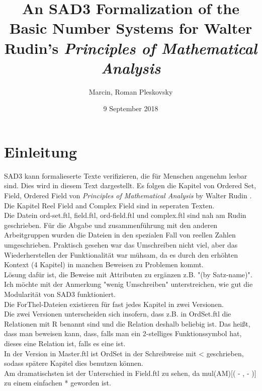 \documentclass{article}
\begin{document}
\title{An SAD3 Formalization of the Basic Number Systems for Walter Rudin's
\it{Principles of Mathematical Analysis}}

\author{Marcin, Roman Pleskovsky}

\date{9 September 2018}

\maketitle


\section{Einleitung}
SAD3 kann formalieserte Texte verifizieren, die f\"ur Menschen angenehm lesbar sind.
Dies wird in diesem Text dargestellt. Es folgen die Kapitel von Ordered Set, Field, Ordered Field von {\it Principles of Mathematical Analysis} by Walter Rudin \cite{Rudin}.\\
Die Kapitel Reel Field and Complex Field sind in seperaten Texten.\\

Die Datein ord-set.ftl, field.ftl, ord-field.ftl und complex.ftl sind nah am Rudin geschrieben. F\"ur die Abgabe und zusammenf\"uhrung mit den anderen Arbeitgruppen wurden die Dateien in den spezialen Fall von reellen Zahlen umgeschrieben. Praktisch gesehen war das Umschreiben nicht viel, aber das Wiederherstellen der Funktionalit\"at war m\"uhsam, da es durch den erh\"ohten Kontext (4 Kapitel) in manchen Beweisen zu Problemen kommt.\\
L\"osung daf\"ur ist, die Beweise mit Attributen zu erg\"anzen z.B. "(by Satz-name)".
Ich m\"ochte mit der Anmerkung "wenig Umschreiben" unterstreichen, wie gut die Modularit\"at von SAD3 funktioniert.\\

Die ForThel-Dateien existieren f\"ur fast jedes Kapitel in zwei Versionen.\\
Die zwei Versionen unterscheiden sich insofern, dass z.B. in OrdSet.ftl die Relationen mit R benannt sind und die Relation deshalb beliebig ist. Das hei\ss t, dass man beweisen kann, dass, falls man ein 2-stelliges Funktionssymbol hat, dieses eine Relation ist, falls es eine ist.\\
In der Version in Master.ftl ist OrdSet in der Schreibweise mit < geschrieben, sodass sp\"atere Kapitel dies benutzen k\"onnen.\\

Am dramatischsten ist der Unterschied in Field.ftl zu sehen, da mul(AM)[( - , - )] zu einem einfachen * geworden ist.\\
\end{document}

